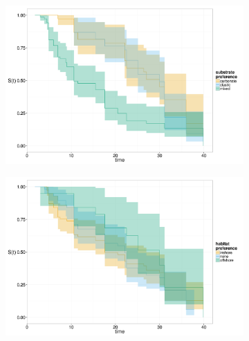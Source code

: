 \documentclass[12pt,letterpaper]{article}
\begin{document}
\begin{figure}[ht]
  \begin{subfigure}[b]{0.5\textwidth}
    \caption{}
    \includegraphics[height = 0.4\textheight, width = \textwidth, keepaspectratio = true]{figure/km_aff}
    \label{subfig:aff_km}
  \end{subfigure}
  \begin{subfigure}[b]{0.5\textwidth}
    \caption{}
    \includegraphics[height = 0.4\textheight, width = \textwidth, keepaspectratio = true]{figure/km_hab}
    \label{subfig:env_km}
  \end{subfigure}


\end{figure}
\end{document}
